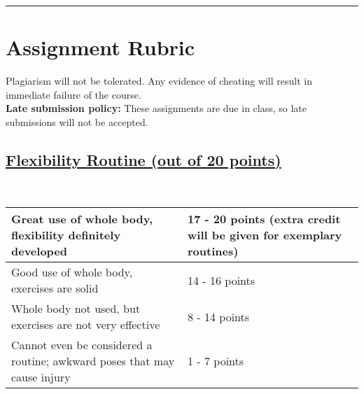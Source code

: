 \documentclass{article}
\begin{document}
\begin{flushleft}
\noindent\rule[0.5ex]{\linewidth}{1pt}
\end{flushleft}

\section*{Assignment Rubric}
Plagiarism will not be tolerated. Any evidence of cheating will result in immediate failure of the course. \\

\textbf{Late submission policy:}
These assignments are due in class, so late submissions will not be accepted.

\subsection*{\underline{Flexibility Routine (out of 20 points)}}
\\
\begin{center}
\begin{tabular}{ | m{6cm} | m{6cm} | } 
\hline
\vspace{.2cm}Great use of whole body, flexibility definitely developed \vspace{.2cm}& \vspace{.2cm} 17 - 20 points (extra credit will be given for exemplary routines) \vspace{.2cm} \\ 
\hline
\vspace{.2cm}Good use of whole body, exercises are solid \vspace{.2cm}& \vspace{.2cm} 14 - 16 points \vspace{.2cm}  \\ 
\hline
\vspace{.2cm}Whole body not used, but exercises are not very effective \vspace{.2cm} &\vspace{.2cm} 8 - 14 points\vspace{.2cm}  \\ 
\hline
\vspace{.2cm}Cannot even be considered a routine; awkward poses that may cause injury\vspace{.2cm} & \vspace{.2cm}1 - 7 points \vspace{.2cm} \\ 
\hline
\end{tabular}
\end{center}
\end{document}
